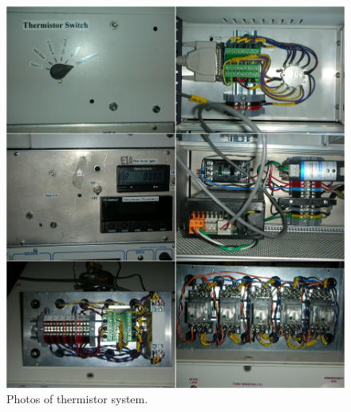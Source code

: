 \begin{figure}[h]
 \centering
 \includegraphics[width=\textwidth]{./img/subsystem-thermistor-photos.png}
 \caption{Photos of thermistor system.}
 \label{fig:subsystem-thermistor-photos}
\end{figure}